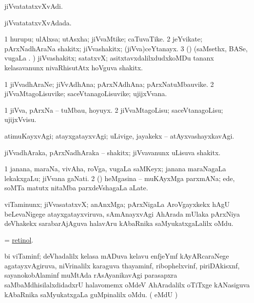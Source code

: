\bentry 
{} 
\gl{\nA}
\expl{}
\bmng
jiVvatatatxvXvAdi. 
\emng
\eentry

\bentry 
{} 
\gl{\gu}
\expl{}
\bmng
jiVvatatatxvXvAdada. 
\emng
\eentry

\bentry
{} 
\gl{\nA}
\expl{}
\bmng
\bnum
\num{1} hurupu; ulAlxsa; utAsxha; jiVvaMtike; caTuvaTike. 
\num{2} jeYvikate; pArxNadhAraNa shakitx; jiVvashakitx; (jiVva)ceYtanayx. 
\num{3} (\rUpa) (saMsethx, BASe, \mo vugaLa \vi. ) jiVvashakitx; satatxvX; asitxtavxdalilxdudxkoMDu tananx kelasavanunx nivaRhisutAtx hoVguva shakitx. 
\enum
\emng
\eentry

\bentry
{} 
\gl{\nA}
\expl{}
\bmng
\bnum
\num{1} jiVvadhAraNe; jiVvAdhAna; pArxNAdhAna; pArxNatuMbauvike. 
\num{2} jiVvaMtagoLisuvike; saceVtanagoLisuvike; ujijxVvana. 
\enum
\emng
\eentry

\bentry 
{} 
\gl{\sakirx}
\expl{}
\bmng
\bnum
\num{1} jiVva, pArxNa -- tuMbau, hoyuyx. 
\num{2} jiVvaMtagoLisu; saceVtanagoLisu; ujijxVvisu. 
\enum
\emng
\eentry

\bentry 
{} 
\gl{\kirxvi}
\expl{}
\bmng
 atimuKayxvAgi; atayxgatayxvAgi; uLivige, jayakekx -- atAyxvashayxkavAgi. 
\emng
\eentry

\bentry 
{}
\gl{\nA}
\expl{}
\bmng
 jiVvadhAraka, pArxNadhAraka -- shakitx; jiVvavanunx uLisuva shakitx. 
\emng
\eentry

\bentry 
{}
\gl{\nA}
\expl{}
\bmng
\bnum
\num{1} janana, maraNa, vivAha, roVga, \mo vugaLa saMKeyx; janana maraNagaLa lekakxgaLu; jiVvana gaNati. 
\num{2} (\AmA) heMgasina -- muKAyxMga parxmANa; ede, soMTa matutx nitaMba parxdeVshagaLa aLate. 
\enum
\emng
\eentry

\bentry
{} 
\gl{\nA}
\expl{}
\bmng
 viTaminunx; jiVvasatatxvX; anAnxMga; pArxNigaLa AroVgayxkekx hAgU beLevaNigege atayxgatayxviruva, sAmAnayxvAgi AhArada mUlaka pArxNiya deVhakekx sarabarAjAguva halavAru kAbaRnika saMyukatxgaLalilx oMdu. 
\emng
\eentry

\bentry 
{}
\gl{\nA}
\expl{}
\bmng
 = \hyperref{kandict_r.pdf}{R}{retinol}{retinol}. 
\emng
\eentry

\bentry 
{}
\gl{\nA}
\expl{}
\bmng
 bi viTaminf; deVhadalilx kelasa mADuva kelavu enfjeYmf kAyARcaraNege agatayxvAgiruva, niVrinalilx karaguva thayaminf, ribophelxvinf, piriDAkisxnf, sayanokobAlaminf muMtAda rAsAyanikavAgi parasapxra saMbaMdhisilalxdidadxrU halavomemx oMdeV AhAradalilx oTiTxge kANasiguva kAbaRnika saMyukatxgaLa guMpinalilx oMdu. (  eMdU \parx) 
\emng


